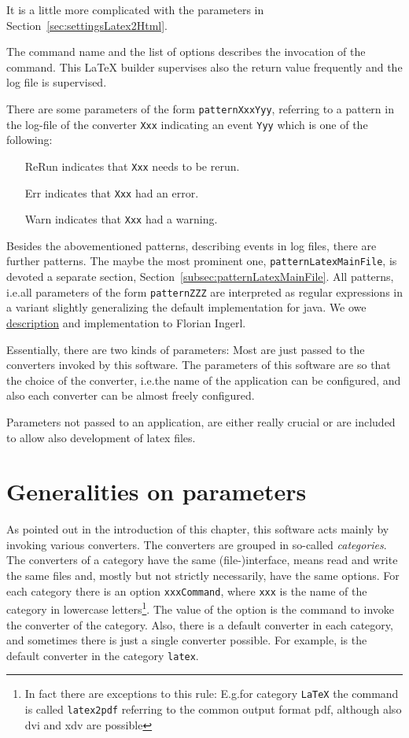 It is a little more complicated 
with the parameters in Section~\ref{sec:settingsLatex2Html}. 

The command name and the list of options describes the invocation of the command. 
This \LaTeX{} builder supervises also the return value frequently and the log file is supervised. 

There are some parameters of the form \texttt{patternXxxYyy}, 
referring to a pattern in the log-file of the converter \texttt{Xxx} 
indicating an event \texttt{Yyy} which is one of the following: 
%
\begin{itemize}
\item[ReRun]
indicates that \texttt{Xxx} needs to be rerun.
\item[Err]
indicates that \texttt{Xxx} had an error. 
\item[Warn]
indicates that \texttt{Xxx} had a warning. 
\end{itemize}

Besides the abovementioned patterns, describing events in log files, 
there are further patterns. 
The maybe the most prominent one, \texttt{patternLatexMainFile}, 
is devoted a separate section, Section~\ref{subsec:patternLatexMainFile}. 
All patterns, i.e.\@ all parameters of the form \texttt{patternZZZ} 
are interpreted as regular expressions 
in a variant slightly generalizing the default implementation for java. 
We owe \href{https://github.com/florianingerl/com.florianingerl.util.regex}{description} 
and implementation to Florian Ingerl. 

Essentially, there are two kinds of parameters: 
Most are just passed to the converters invoked by this software. 
The parameters of this software 
are so that the choice of the converter, i.e.\@ the name of the application 
can be configured, 
and also each converter can be almost freely configured. 

Parameters not passed to an application, 
are either really crucial 
or are included to allow also development of latex files. 

\section{Generalities on parameters}\label{sec:genOnSettings}

As pointed out in the introduction of this chapter, 
this software acts mainly by invoking various converters. 
The converters are grouped in so-called \emph{categories}. 
The converters of a category have the same (file-)interface, %
means read and write the same files and, 
mostly but not strictly necessarily, have the same options. 
For each category there is an option \texttt{xxxCommand}, 
where \texttt{xxx} is the name of the category in lowercase letters\footnote%
{In fact there are exceptions to this rule: E.g.\@ for category \texttt{LaTeX} 
the command is called \texttt{latex2pdf} referring to the common output format \gls{pdf}, 
although also \gls{dvi} and \gls{xdv} are possible}. 
The value of the option is the command to invoke the converter of the category. 
Also, there is a default converter in each category, 
and sometimes there is just a single converter possible. 
For example, \lualatex{} is the default converter in the category \texttt{latex}. 

